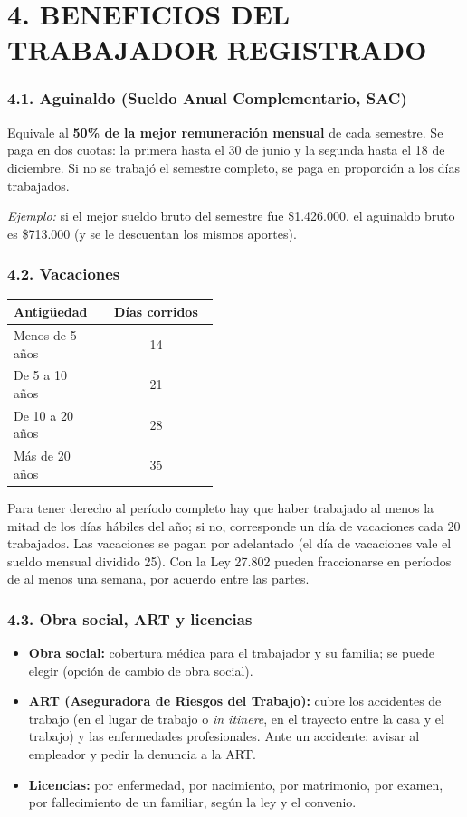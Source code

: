 \section*{4. BENEFICIOS DEL TRABAJADOR REGISTRADO}

\subsubsection*{4.1. Aguinaldo (Sueldo Anual Complementario, SAC)}
Equivale al \textbf{50\% de la mejor remuneración mensual} de cada semestre. Se paga en dos
cuotas: la primera hasta el 30 de junio y la segunda hasta el 18 de diciembre. Si no se
trabajó el semestre completo, se paga en proporción a los días trabajados.

\textit{Ejemplo:} si el mejor sueldo bruto del semestre fue \$1.426.000, el aguinaldo bruto es
\$713.000 (y se le descuentan los mismos aportes).

\subsubsection*{4.2. Vacaciones}
\begin{center}
\small
\begin{tabular}{|p{0.45\linewidth}|c|}
\hline
\textbf{Antigüedad} & \textbf{Días corridos} \\ \hline
Menos de 5 años & 14 \\ \hline
De 5 a 10 años & 21 \\ \hline
De 10 a 20 años & 28 \\ \hline
Más de 20 años & 35 \\ \hline
\end{tabular}
\end{center}
Para tener derecho al período completo hay que haber trabajado al menos la mitad de los días
hábiles del año; si no, corresponde un día de vacaciones cada 20 trabajados. Las vacaciones se
pagan por adelantado (el día de vacaciones vale el sueldo mensual dividido 25). Con la Ley
27.802 pueden fraccionarse en períodos de al menos una semana, por acuerdo entre las partes.

\subsubsection*{4.3. Obra social, ART y licencias}
\begin{itemize}
  \item \textbf{Obra social:} cobertura médica para el trabajador y su familia; se puede
        elegir (opción de cambio de obra social).
  \item \textbf{ART (Aseguradora de Riesgos del Trabajo):} cubre los accidentes de trabajo
        (en el lugar de trabajo o \textit{in itinere}, en el trayecto entre la casa y el
        trabajo) y las enfermedades profesionales. Ante un accidente: avisar al empleador y
        pedir la denuncia a la ART.
  \item \textbf{Licencias:} por enfermedad, por nacimiento, por matrimonio, por examen, por
        fallecimiento de un familiar, según la ley y el convenio.
\end{itemize}

